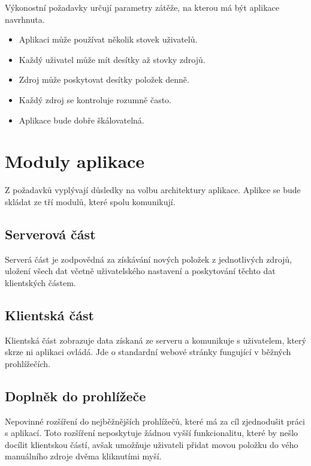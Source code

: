 Výkonostní požadavky určují parametry zátěže, na kterou má být aplikace navrhnuta.

\begin{itemize}
	\item Aplikaci může používat několik stovek uživatelů.
    \item Každý uživatel může mít desítky až stovky zdrojů.
	\item Zdroj může poskytovat desítky položek denně.
    \item Každý zdroj se kontroluje rozumně často.
    \item Aplikace bude dobře škálovatelná.
\end{itemize}

\section{Moduly aplikace}

Z požadavků vyplývají důsledky na volbu architektury aplikace.
Aplikce se bude skládat ze tří modulů, které spolu komunikují.


\subsection{Serverová část}

Serverá část je zodpovědná za získávání nových položek z jednotlivých zdrojů, uložení všech dat včetně uživatelského nastavení a poskytování těchto dat klientských částem.

\subsection{Klientská část}

Klientská část zobrazuje data získaná ze serveru a komunikuje s uživatelem, který skrze ni aplikaci ovládá.
Jde o standardní webové stránky fungující v běžných prohlížečích.

\subsection{Doplněk do prohlížeče}

Nepovinné rozšíření do nejběžnějších prohlížečů, které má za cíl zjednodušit práci s aplikací.
Toto rozšíření neposkytuje žádnou vyšší funkcionalitu, které by nešlo docílit klientskou částí, avšak umožňuje uživateli přidat movou položku do vého manuálního zdroje dvěma kliknutími myší.

